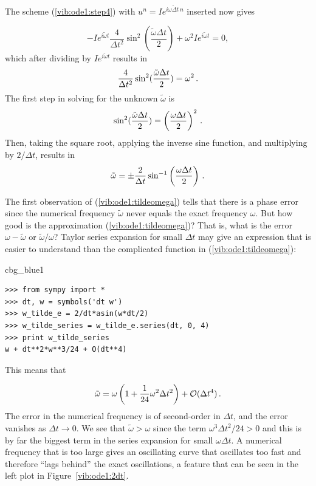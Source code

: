 \documentclass[%
oneside,                 %
final,                   %
10pt]{article}
\newenvironment{_cod_tight}[1]{
   \def\FrameCommand{\colorbox{#1}}
   \FrameRule0.6pt\MakeFramed {\FrameRestore}\vskip3mm}
   {\vskip0mm\endMakeFramed}
\newenvironment{cod}[1]{
\bgroup\rmfamily
\fboxsep=0mm\relax
\begin{_cod_tight}{#1}
\list{}{\parsep=-2mm\parskip=0mm\topsep=0pt\leftmargin=2mm
\rightmargin=2\leftmargin\leftmargin=4pt\relax}
\item\relax}
{\endlist\end{_cod_tight}\egroup}
\begin{document}
The scheme (\ref{vib:ode1:step4})
with $u^n=Ie^{i\omega\tilde\Delta t\, n}$ inserted now gives

\begin{equation}
-Ie^{i\tilde\omega t}\frac{4}{\Delta t^2}\sin^2(\frac{\tilde\omega\Delta t}{2})
+ \omega^2 Ie^{i\tilde\omega t} = 0,
\end{equation}
which after dividing by $Ie^{i\tilde\omega t}$ results in
\begin{equation}
\frac{4}{\Delta t^2}\sin^2(\frac{\tilde\omega\Delta t}{2}) = \omega^2
\tp
\end{equation}
The first step in solving for the unknown $\tilde\omega$ is
\[ \sin^2(\frac{\tilde\omega\Delta t}{2}) = \left(\frac{\omega\Delta t}{2}\right)^2
\tp
\]
Then, taking the square root, applying the inverse sine function, and
multiplying by $2/\Delta t$, results in
\begin{equation}
\tilde\omega = \pm \frac{2}{\Delta t}\sin^{-1}\left(\frac{\omega\Delta t}{2}\right)
\tp
\label{vib:ode1:tildeomega}
\end{equation}

The first observation of (\ref{vib:ode1:tildeomega}) tells that
there is a phase error since the numerical frequency $\tilde\omega$
never equals the exact frequency $\omega$. But how good is
the approximation (\ref{vib:ode1:tildeomega})? That is, what
is the error $\omega - \tilde\omega$ or $\tilde\omega/\omega$?
Taylor series expansion
for small $\Delta t$ may give an expression that is easier to understand
than the complicated function in (\ref{vib:ode1:tildeomega}):

\begin{cod}{cbg_blue1}\begin{Verbatim}[numbers=none,fontsize=\fontsize{9pt}{9pt},baselinestretch=0.95,xleftmargin=2mm]
>>> from sympy import *
>>> dt, w = symbols('dt w')
>>> w_tilde_e = 2/dt*asin(w*dt/2)
>>> w_tilde_series = w_tilde_e.series(dt, 0, 4)
>>> print w_tilde_series
w + dt**2*w**3/24 + O(dt**4)
\end{Verbatim}
\end{cod}
\noindent
This means that

\begin{equation}
\tilde\omega = \omega\left( 1 + \frac{1}{24}\omega^2\Delta t^2\right)
+ \Oof{\Delta t^4}
\tp
\label{vib:ode1:tildeomega:series}
\end{equation}
The error in the numerical frequency is of second-order in
$\Delta t$, and the error vanishes as $\Delta t\rightarrow 0$.
We see that $\tilde\omega > \omega$ since the term $\omega^3\Delta t^2/24 >0$
and this is by far the biggest term in the series expansion for small
$\omega\Delta t$. A numerical frequency that is too large gives an oscillating
curve that oscillates too fast and therefore ``lags behind'' the exact
oscillations, a feature that can be seen in the left plot in Figure~\ref{vib:ode1:2dt}.
\end{document}
